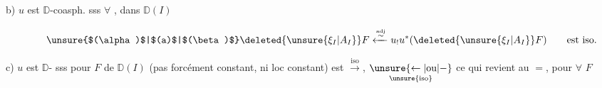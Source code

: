 b) $u$ est $\mathbb{D}$-coasph. sss $\forall$ \deleted{\unsure{$\xi$}} \uline{}, dans $\mathbb{D}(I)$

\[
 \tag*{\unsure{$(\alpha)$|$(a)$|$(\beta)$}}
 \deleted{\unsure{\xi_I|A_I}}F\xleftarrow{\overset{\mathrm{adj}}{\sim}}
 u_!u^*(\deleted{\unsure{\xi_I|A_I}}F)\qquad\text{est iso.}
\]

c) $u$ est $\mathbb{D}$-  sss pour \uuline{$\forall$} $F$ de $\mathbb{D}(I)$  (pas forcément constant, ni loc constant)  est $\xrightarrow{\mathrm{iso}}$, $\underset{\unsure{\mathrm{iso}}}{\unsure{\leftarrow|\text{ou}|-}}$ ce qui revient au $=$, pour $\forall$ $F$ 
